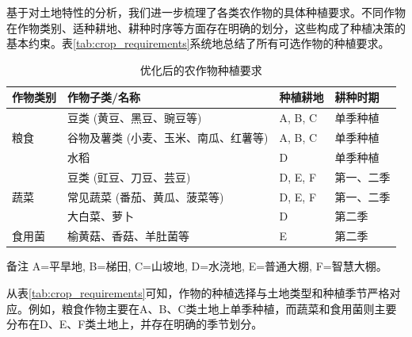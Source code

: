 基于对土地特性的分析，我们进一步梳理了各类农作物的具体种植要求。不同作物在作物类别、适种耕地、耕种时序等方面存在明确的划分，这些构成了种植决策的基本约束。表\ref{tab:crop_requirements}系统地总结了所有可选作物的种植要求。

\begin{table}[htbp]
    \centering
    \begin{threeparttable}
        \caption{优化后的农作物种植要求}
        \label{tab:crop_requirements_optimized_1}
        \begin{tabularx}{\columnwidth}{l l >{\raggedright\arraybackslash}X l}
            \toprule
            作物类别 & 作物子类/名称 & 种植耕地 & 耕种时期 \\
            \midrule
            \multirow{3}{*}{粮食}
            & 豆类 (黄豆、黑豆、豌豆等) & A, B, C & 单季种植 \\
            \addlinespace %
            & 谷物及薯类 (小麦、玉米、南瓜、红薯等) & A, B, C & 单季种植 \\
            \addlinespace
            & 水稻 & D & 单季种植 \\
            \midrule
            \multirow{3}{*}{蔬菜}
            & 豆类 (豇豆、刀豆、芸豆) & D, E, F & 第一、二季 \\
            \addlinespace
            & 常见蔬菜 (番茄、黄瓜、菠菜等) & D, E, F & 第一、二季 \\
            \addlinespace
            & 大白菜、萝卜 & D & 第二季 \\
            \midrule
            食用菌 & 榆黄菇、香菇、羊肚菌等 & E & 第二季 \\
            \bottomrule
        \end{tabularx}
        \begin{tablenotes}[flushleft]
            \footnotesize %
            \item[备注] A=平旱地, B=梯田, C=山坡地, D=水浇地, E=普通大棚, F=智慧大棚。
        \end{tablenotes}
    \end{threeparttable}
\end{table}


从表\ref{tab:crop_requirements}可知，作物的种植选择与土地类型和种植季节严格对应。例如，粮食作物主要在A、B、C类土地上单季种植，而蔬菜和食用菌则主要分布在D、E、F类土地上，并存在明确的季节划分。

